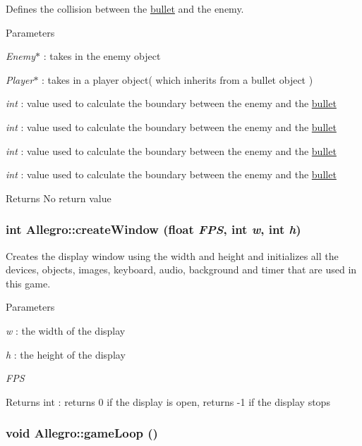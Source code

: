 Defines the collision between the \hyperlink{classbullet}{bullet} and the enemy. 
\begin{DoxyParams}{Parameters}
\item[{\em Enemy$\ast$}]: takes in the enemy object \item[{\em Player$\ast$}]: takes in a player object( which inherits from a bullet object ) \item[{\em int}]: value used to calculate the boundary between the enemy and the \hyperlink{classbullet}{bullet} \item[{\em int}]: value used to calculate the boundary between the enemy and the \hyperlink{classbullet}{bullet} \item[{\em int}]: value used to calculate the boundary between the enemy and the \hyperlink{classbullet}{bullet} \item[{\em int}]: value used to calculate the boundary between the enemy and the \hyperlink{classbullet}{bullet} \end{DoxyParams}
\begin{DoxyReturn}{Returns}
No return value 
\end{DoxyReturn}
\hypertarget{classAllegro_a5669e6448fac3a62871a2fe5dcf00aeb}{
\subsubsection[{createWindow}]{\setlength{\rightskip}{0pt plus 5cm}int Allegro::createWindow (float {\em FPS}, \/  int {\em w}, \/  int {\em h})}}
\label{classAllegro_a5669e6448fac3a62871a2fe5dcf00aeb}


Creates the display window using the width and height and initializes all the devices, objects, images, keyboard, audio, background and timer that are used in this game. 
\begin{DoxyParams}{Parameters}
\item[{\em w}]: the width of the display \item[{\em h}]: the height of the display \item[{\em FPS}]\end{DoxyParams}
\begin{DoxyReturn}{Returns}
int : returns 0 if the display is open, returns -\/1 if the display stops 
\end{DoxyReturn}
\hypertarget{classAllegro_ae0fe43326c885fa115169c68d74e7ff5}{
\subsubsection[{gameLoop}]{\setlength{\rightskip}{0pt plus 5cm}void Allegro::gameLoop ()}}
\label{classAllegro_ae0fe43326c885fa115169c68d74e7ff5}


